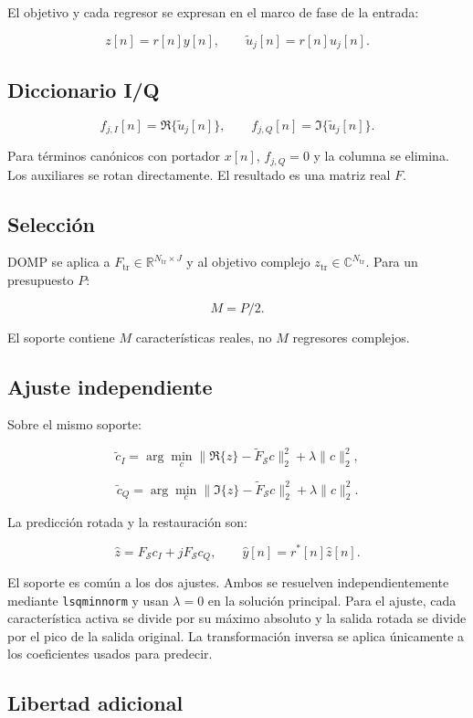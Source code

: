 \documentclass[10pt,a4paper]{article}
\newcommand{\code}[1]{\texttt{#1}}
\newcommand{\R}{\mathbb{R}}
\newcommand{\C}{\mathbb{C}}
\begin{document}
El objetivo y cada regresor se expresan en el marco de fase de la entrada:

\[
z[n]=r[n]y[n],
\qquad
\widetilde u_j[n]=r[n]u_j[n].
\]

\subsection{Diccionario I/Q}

\[
f_{j,I}[n]=\Re\{\widetilde u_j[n]\},
\qquad
f_{j,Q}[n]=\Im\{\widetilde u_j[n]\}.
\]

Para términos canónicos con portador \(x[n]\), \(f_{j,Q}=0\) y la columna se
elimina. Los auxiliares se rotan directamente. El resultado es una matriz real
\(F\).

\subsection{Selección}

DOMP se aplica a \(F_{\mathrm{tr}}\in\R^{N_{\mathrm{tr}}\times J}\) y al
objetivo complejo \(z_{\mathrm{tr}}\in\C^{N_{\mathrm{tr}}}\). Para un
presupuesto \(P\):

\[
M=P/2.
\]

El soporte contiene \(M\) características reales, no \(M\) regresores
complejos.

\subsection{Ajuste independiente}

Sobre el mismo soporte:

\[
\widetilde c_I
=\arg\min_c
\|\Re\{z\}-\widetilde F_{\mathcal S}c\|_2^2
+\lambda\|c\|_2^2,
\]

\[
\widetilde c_Q
=\arg\min_c
\|\Im\{z\}-\widetilde F_{\mathcal S}c\|_2^2
+\lambda\|c\|_2^2.
\]

La predicción rotada y la restauración son:

\[
\hat z=F_{\mathcal S}c_I+jF_{\mathcal S}c_Q,
\qquad
\hat y[n]=r^*[n]\hat z[n].
\]

El soporte es común a los dos ajustes. Ambos se resuelven independientemente
mediante \code{lsqminnorm} y usan \(\lambda=0\) en la solución principal.
Para el ajuste, cada característica activa se divide por su máximo absoluto y
la salida rotada se divide por el pico de la salida original. La transformación
inversa se aplica únicamente a los coeficientes usados para predecir.

\subsection{Libertad adicional}
\end{document}
